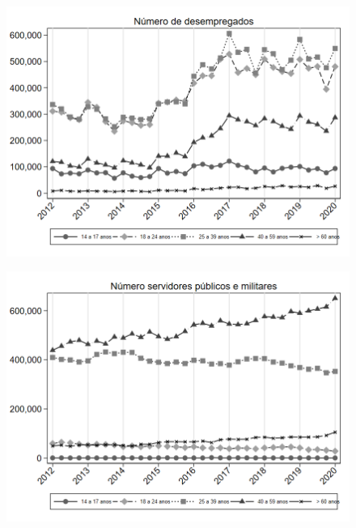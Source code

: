 \begin{frame}[label=_composicao_demografica_faixa_etaria_n_de_desemprego]{}
\textit{\hyperlink{_composicao_demografica_faixa_etaria}{}}
\begin{figure}
  \centering
  \includegraphics[width=1.0\linewidth]{../../analysis/output/composicao_demografica/faixa_etaria/_composicao_demografica_faixa_etaria_n_de_desemprego.png}
  \caption{}
  \label{fig:_composicao_demografica_faixa_etaria_n_de_desemprego}
\end{figure}
\end{frame}

\begin{frame}[label=_composicao_demografica_faixa_etaria_n_militar]{}
\textit{\hyperlink{_composicao_demografica_faixa_etaria}{}}
\begin{figure}
  \centering
  \includegraphics[width=1.0\linewidth]{../../analysis/output/composicao_demografica/faixa_etaria/_composicao_demografica_faixa_etaria_n_militar.png}
  \caption{}
  \label{fig:_composicao_demografica_faixa_etaria_n_militar}
\end{figure}
\end{frame}


